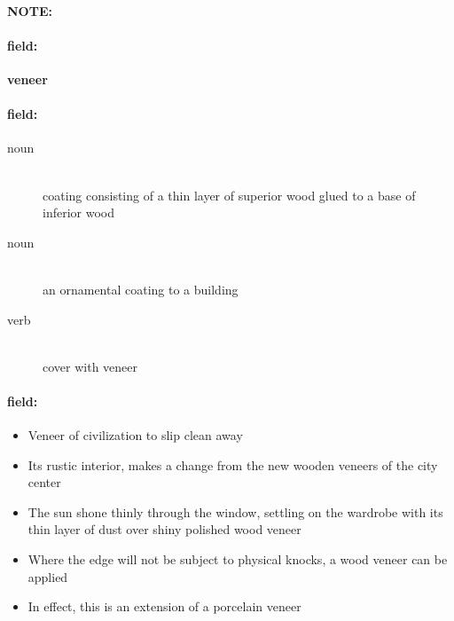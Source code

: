 \documentclass[12pt]{article}
\newenvironment{note}{\paragraph{NOTE:}}{}
\newenvironment{field}{\paragraph{field:}}{}
\begin{document}
\begin{note}
\begin{field}
\textbf{\large veneer}
\end{field}


\begin{field}
\begin{description}
\item[noun] \hfill \\ 
coating consisting of a thin layer of superior wood glued to a base of inferior wood

\item[noun] \hfill \\ 
an ornamental coating to a building

\item[verb] \hfill \\ 
cover with veneer

\end{description}
\end{field}

\begin{field}
\begin{itemize}
\item Veneer of civilization to slip clean away
\item Its rustic interior, makes a change from the new wooden veneers of the city center
\item The sun shone thinly through the window, settling on the wardrobe with its thin layer of dust over shiny polished wood veneer
\item Where the edge will not be subject to physical knocks, a wood veneer can be applied
\item In effect, this is an extension of a porcelain veneer
\end{itemize}
\end{field}
\end{note}
\end{document}
